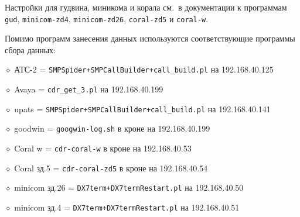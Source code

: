 \noindent
Настройки для гудвина, миникома и корала см.\ в документации к программам {\tt gud}, {\tt minicom-zd4}, {\tt minicom-zd26}, {\tt coral-zd5} и {\tt coral-w}.
\bigskip

\noindent Помимо программ занесения данных используются соответствующие программы сбора данных:

\noindent $\diamond$ АТС-2 = {\tt SMPSpider+SMPCallBuilder+call\_build.pl} на 192.168.40.125 \par
\noindent $\diamond$ Avaya = {\tt cdr\_get\_3.pl} на 192.168.40.199 \par
\noindent $\diamond$ upats = {\tt SMPSpider+SMPCallBuilder+call\_build.pl} на 192.168.40.141 \par
\noindent $\diamond$ goodwin = {\tt googwin-log.sh} в кроне на 192.168.40.199 \par
\noindent $\diamond$ Coral w = {\tt cdr-coral-w} в кроне на 192.168.40.53 \par
\noindent $\diamond$ Coral зд.5 = {\tt cdr-coral-zd5} в кроне на 192.168.40.54 \par
\noindent $\diamond$ minicom зд.26 = {\tt DX7term+DX7termRestart.pl} на 192.168.40.50 \par %
\noindent $\diamond$ minicom зд.4 = {\tt DX7term+DX7termRestart.pl} на 192.168.40.51 %

\vfill
\eject
\bye
